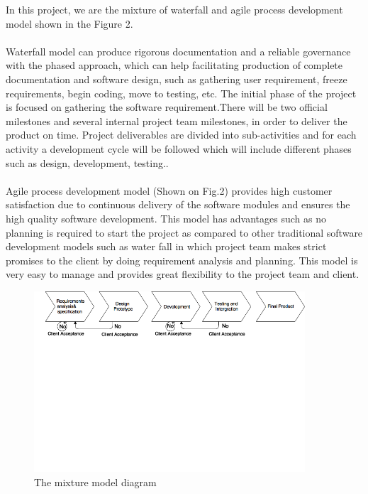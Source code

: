 In this project, we are the mixture of waterfall and agile process development model shown in the Figure 2. 
\paragraph{} Waterfall model can produce rigorous documentation and a reliable governance with the phased approach, which can help facilitating production of complete documentation and software design, such as gathering user requirement, freeze requirements, begin coding, move to testing, etc. The initial phase of the project is focused on gathering the software requirement.There will be two official milestones and several internal project team milestones, in order to deliver the product on time. Project deliverables are divided into sub-activities and for each activity a development cycle will be followed which will include different phases such as design, development, testing..

\paragraph{} Agile process development model (Shown on Fig.2) provides high customer satisfaction due to continuous delivery of the software modules and ensures the high quality software development. This model has advantages such as no planning is required to start the project as compared to other traditional software development models such as water fall in which project team makes strict promises to the client by doing requirement analysis and planning. This model is very easy to manage and provides great flexibility to the project team and client.

\begin{figure}
	\centering
	\includegraphics[width=0.9\textwidth]{model.png}
	\caption{\label{fig:process_model}The mixture  model diagram}
\end{figure}


